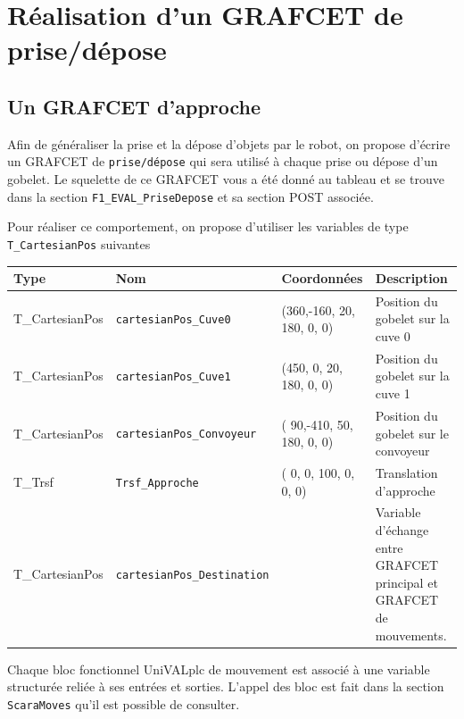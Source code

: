 \section{Réalisation d'un GRAFCET de prise/dépose}
\subsection{Un GRAFCET d'approche}
Afin de généraliser la prise et la dépose d'objets par le robot, on propose d'écrire un GRAFCET de \texttt{prise/dépose} qui sera utilisé à chaque prise ou dépose d'un gobelet. Le squelette de ce GRAFCET vous a été donné au tableau et se trouve dans la section \texttt{F1\_EVAL\_PriseDepose} et sa section POST associée.

Pour réaliser ce comportement, on propose d'utiliser les variables de type \texttt{T\_CartesianPos} suivantes
\begin{center}
  \begin{tabular}{l|l|l|p{5cm}}
    Type & Nom                                     & Coordonnées                   & Description                           \\\hline\hline
    T\_CartesianPos & \texttt{cartesianPos\_Cuve0}            & (360,-160,  20, 180,  0,  0)  & Position du gobelet sur la cuve 0     \\
    T\_CartesianPos & \texttt{cartesianPos\_Cuve1}            & (450,   0,  20, 180,  0,  0)  & Position du gobelet sur la cuve 1     \\
    T\_CartesianPos & \texttt{cartesianPos\_Convoyeur}        & ( 90,-410,  50, 180,  0,  0)  & Position du gobelet sur le convoyeur  \\\hline
    T\_Trsf & \texttt{Trsf\_Approche}                 & (  0,   0, 100,   0,  0,  0)  & Translation d'approche                \\\hline
    T\_CartesianPos & \texttt{cartesianPos\_Destination}      &                               & Variable d'échange entre GRAFCET principal et GRAFCET de mouvements. \\
  \end{tabular}
\end{center}

Chaque bloc fonctionnel UniVALplc de mouvement est associé à une variable structurée reliée à ses entrées et sorties. L'appel des bloc est fait dans la section \texttt{ScaraMoves} qu'il est possible de consulter.

